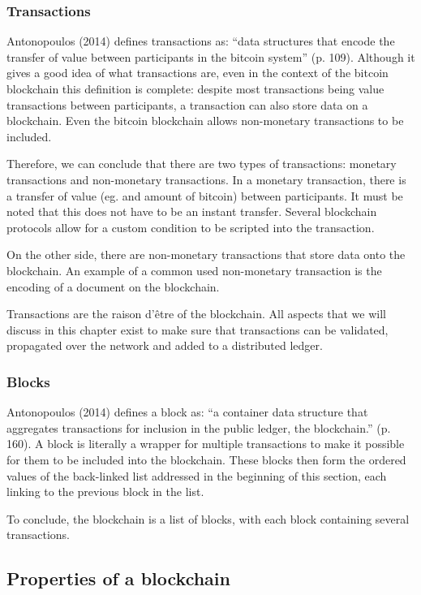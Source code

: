 \subsubsection{Transactions}

Antonopoulos (2014) \cite{antonopoulos:2014} defines transactions as: ``data structures that encode the transfer of value between participants in the bitcoin system'' (p. 109). Although it gives a good idea of what transactions are, even in the context of the bitcoin blockchain this definition is complete: despite most transactions being value transactions between participants, a transaction can also store data on a blockchain. Even the bitcoin blockchain allows non-monetary transactions to be included.

Therefore, we can conclude that there are two types of transactions: monetary transactions and non-monetary transactions. In a monetary transaction, there is a transfer of value (eg. and amount of bitcoin) between participants. It must be noted that this does not have to be an instant transfer. Several blockchain protocols allow for a custom condition to be scripted into the transaction.

On the other side, there are non-monetary transactions that store data onto the blockchain. An example of a common used non-monetary transaction is the encoding of a document on the blockchain.

Transactions are the raison d'\^{e}tre of the blockchain. All aspects that we will discuss in this chapter exist to make sure that transactions can be validated, propagated over the network and added to a distributed ledger.

\subsubsection{Blocks}

Antonopoulos (2014) \cite{antonopoulos:2014} defines a block as: ``a container data structure that aggregates transactions for inclusion in the public ledger, the blockchain.'' (p. 160). A block is literally a wrapper for multiple transactions to make it possible for them to be included into the blockchain. These blocks then form the ordered values of the back-linked list addressed in the beginning of this section, each linking to the previous block in the list.

To conclude, the blockchain is a list of blocks, with each block containing several transactions.

\subsection{Properties of a blockchain}

